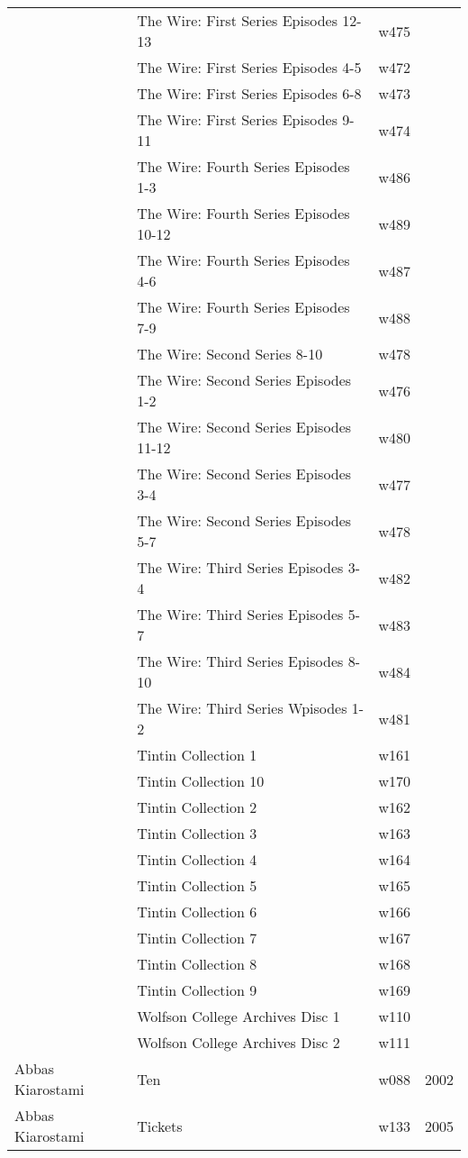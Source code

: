 \documentclass{article}
\begin{document}
\begin {center}
\begin{longtable}{l p{10cm} l l}
 & The Wire: First Series Episodes 12-13 & w475 &  \\
 & The Wire: First Series Episodes 4-5 & w472 &  \\
 & The Wire: First Series Episodes 6-8 & w473 &  \\
 & The Wire: First Series Episodes 9-11 & w474 &  \\
 & The Wire: Fourth Series Episodes 1-3 & w486 &  \\
 & The Wire: Fourth Series Episodes 10-12 & w489 &  \\
 & The Wire: Fourth Series Episodes 4-6 & w487 &  \\
 & The Wire: Fourth Series Episodes 7-9 & w488 &  \\
 & The Wire: Second Series 8-10 & w478 &  \\
 & The Wire: Second Series Episodes 1-2 & w476 &  \\
 & The Wire: Second Series Episodes 11-12 & w480 &  \\
 & The Wire: Second Series Episodes 3-4 & w477 &  \\
 & The Wire: Second Series Episodes 5-7 & w478 &  \\
 & The Wire: Third Series Episodes 3-4 & w482 &  \\
 & The Wire: Third Series Episodes 5-7 & w483 &  \\
 & The Wire: Third Series Episodes 8-10 & w484 &  \\
 & The Wire: Third Series Wpisodes 1-2 & w481 &  \\
 & Tintin Collection 1 & w161 &  \\
 & Tintin Collection 10 & w170 &  \\
 & Tintin Collection 2 & w162 &  \\
 & Tintin Collection 3 & w163 &  \\
 & Tintin Collection 4 & w164 &  \\
 & Tintin Collection 5 & w165 &  \\
 & Tintin Collection 6 & w166 &  \\
 & Tintin Collection 7 & w167 &  \\
 & Tintin Collection 8 & w168 &  \\
 & Tintin Collection 9 & w169 &  \\
 & Wolfson College Archives Disc 1 & w110 &  \\
 & Wolfson College Archives Disc 2 & w111 &  \\
Abbas Kiarostami & Ten & w088 & 2002 \\
Abbas Kiarostami & Tickets & w133 & 2005 \\

\end{longtable}
\end{center}
\end{document}
